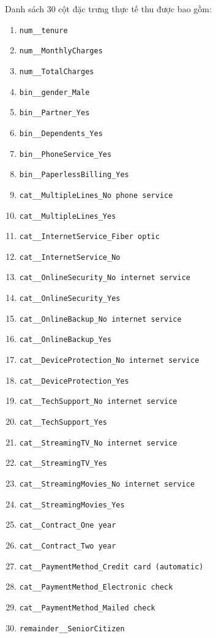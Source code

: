 \documentclass[a4paper]{article}
\begin{document}
{\noindent Danh sách 30 cột đặc trưng thực tế thu được bao gồm:
\begin{enumerate}[itemsep=1pt, topsep=2pt]
    \item \texttt{num\_\_tenure}
    \item \texttt{num\_\_MonthlyCharges}
    \item \texttt{num\_\_TotalCharges}
    \item \texttt{bin\_\_gender\_Male}
    \item \texttt{bin\_\_Partner\_Yes}
    \item \texttt{bin\_\_Dependents\_Yes}
    \item \texttt{bin\_\_PhoneService\_Yes}
    \item \texttt{bin\_\_PaperlessBilling\_Yes}
    \item \texttt{cat\_\_MultipleLines\_No phone service}
    \item \texttt{cat\_\_MultipleLines\_Yes}
    \item \texttt{cat\_\_InternetService\_Fiber optic}
    \item \texttt{cat\_\_InternetService\_No}
    \item \texttt{cat\_\_OnlineSecurity\_No internet service}
    \item \texttt{cat\_\_OnlineSecurity\_Yes}
    \item \texttt{cat\_\_OnlineBackup\_No internet service}
    \item \texttt{cat\_\_OnlineBackup\_Yes}
    \item \texttt{cat\_\_DeviceProtection\_No internet service}
    \item \texttt{cat\_\_DeviceProtection\_Yes}
    \item \texttt{cat\_\_TechSupport\_No internet service}
    \item \texttt{cat\_\_TechSupport\_Yes}
    \item \texttt{cat\_\_StreamingTV\_No internet service}
    \item \texttt{cat\_\_StreamingTV\_Yes}
    \item \texttt{cat\_\_StreamingMovies\_No internet service}
    \item \texttt{cat\_\_StreamingMovies\_Yes}
    \item \texttt{cat\_\_Contract\_One year}
    \item \texttt{cat\_\_Contract\_Two year}
    \item \texttt{cat\_\_PaymentMethod\_Credit card (automatic)}
    \item \texttt{cat\_\_PaymentMethod\_Electronic check}
    \item \texttt{cat\_\_PaymentMethod\_Mailed check}
    \item \texttt{remainder\_\_SeniorCitizen}
\end{enumerate}

}
\end{document}
